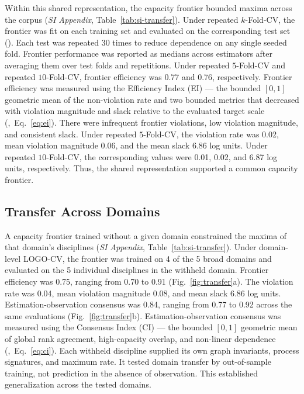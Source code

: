 \documentclass{article}
\begin{document}
Within this shared representation, the capacity frontier bounded maxima across the corpus (\textit{SI Appendix}, Table~\ref{tab:si-transfer}). Under repeated $k$-Fold-CV, the frontier was fit on each training set and evaluated on the corresponding test set (). Each test was repeated 30 times to reduce dependence on any single seeded fold. Frontier performance was reported as medians across estimators after averaging them over test folds and repetitions. Under repeated $5$-Fold-CV and repeated $10$-Fold-CV, frontier efficiency was 0.77 and 0.76, respectively. Frontier efficiency was measured using the Efficiency Index (EI) --- the bounded $[0, 1]$ geometric mean of the non-violation rate and two bounded metrics that decreased with violation magnitude and slack relative to the evaluated target scale (,~Eq.~\eqref{eq:ei}). There were infrequent frontier violations, low violation magnitude, and consistent slack. Under repeated $5$-Fold-CV, the violation rate was 0.02, mean violation magnitude 0.06, and the mean slack 6.86 log units. Under repeated $10$-Fold-CV, the corresponding values were 0.01, 0.02, and 6.87 log units, respectively. 
Thus, the shared representation supported a common capacity frontier.

\subsection*{Transfer Across Domains}
\label{sub-sec:transfer}
A capacity frontier trained without a given domain constrained the maxima of that domain’s disciplines (\textit{SI Appendix}, Table~\ref{tab:si-transfer}). Under domain-level LOGO-CV, the frontier was trained on 4 of the 5 broad domains and evaluated on the 5 individual disciplines in the withheld domain. Frontier efficiency was 0.75, ranging from 0.70 to 0.91 (Fig.~\ref{fig:transfer}a). The violation rate was 0.04, mean violation magnitude 0.08, and mean slack 6.86 log units. Estimation-observation consensus was 0.84, ranging from 0.77 to 0.92 across the same evaluations (Fig.~\ref{fig:transfer}b). Estimation-observation consensus was measured using the Consensus Index (CI) --- the bounded $[0, 1]$ geometric mean of global rank agreement, high-capacity overlap, and non-linear dependence (,~Eq.~\eqref{eq:ci}). Each withheld discipline supplied its own graph invariants, process signatures, and maximum rate. It tested domain transfer by out-of-sample training, not prediction in the absence of observation. This established generalization across the tested domains.
\end{document}
